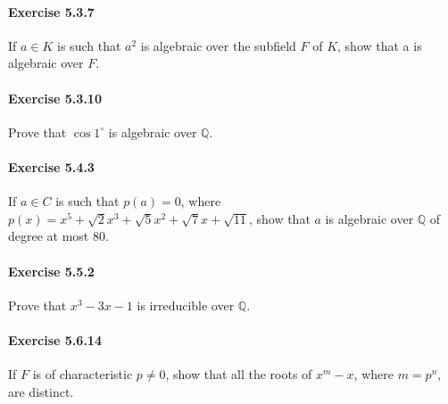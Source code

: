 \documentclass{article}
\begin{document}
\paragraph{Exercise 5.3.7} If $a \in K$ is such that $a^2$ is algebraic over the subfield $F$ of $K$, show that a is algebraic over $F$.


\paragraph{Exercise 5.3.10} Prove that $\cos 1^{\circ}$  is algebraic over $\mathbb{Q}$.


\paragraph{Exercise 5.4.3} If $a \in C$ is such that $p(a) = 0$, where $p(x) = x^5 + \sqrt{2}x^3 + \sqrt{5}x^2 + \sqrt{7}x + \sqrt{11}$, show that $a$ is algebraic over $\mathbb{Q}$ of degree at most 80.


\paragraph{Exercise 5.5.2} Prove that $x^3 - 3x - 1$ is irreducible over $\mathbb{Q}$.


\paragraph{Exercise 5.6.14} If $F$ is of characteristic $p \neq 0$, show that all the roots of $x^m - x$, where $m = p^n$, are distinct.
\end{document}
